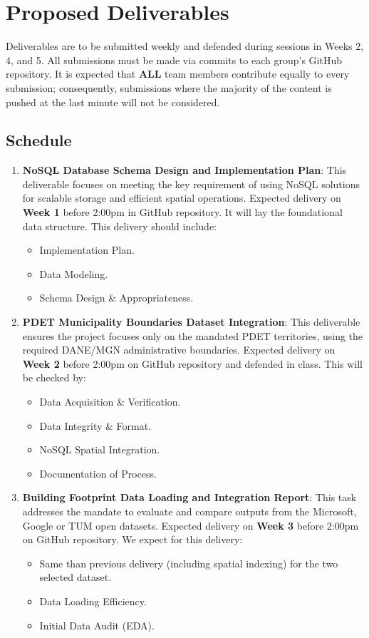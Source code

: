 \documentclass[12pt]{article}
\begin{document}
\section{Proposed Deliverables}
Deliverables are to be submitted weekly and defended during sessions in Weeks 2, 4, and 5. All submissions must be made via commits to each group's GitHub repository. It is expected that \textbf{ALL} team members contribute equally to every submission; consequently, submissions where the majority of the content is pushed at the last minute will not be considered.

\subsection{Schedule}
\begin{enumerate}
  \item \textbf{NoSQL Database Schema Design and Implementation Plan}:  This deliverable focuses on meeting the key requirement of using NoSQL solutions for scalable storage and efficient spatial operations.  Expected delivery on \textbf{Week 1} before 2:00pm in GitHub repository. It will lay the foundational data structure.  This delivery should include:
    \begin{itemize}
      \item Implementation Plan.
      \item Data Modeling.
      \item Schema Design \& Appropriateness.
    \end{itemize}

  \item \textbf{PDET Municipality Boundaries Dataset Integration}: This deliverable ensures the project focuses only on the mandated PDET territories, using the required DANE/MGN administrative boundaries. Expected delivery on \textbf{Week 2} before 2:00pm on GitHub repository and defended in class. This will be checked by:
    \begin{itemize}
      \item Data Acquisition \& Verification.
      \item Data Integrity \& Format.
      \item NoSQL Spatial Integration.
      \item Documentation of Process.
    \end{itemize}

  \item \textbf{Building Footprint Data Loading and Integration Report}:  This task addresses the mandate to evaluate and compare outputs from the Microsoft, Google or TUM open datasets. Expected delivery on \textbf{Week 3} before 2:00pm on GitHub repository. We expect for this delivery:
    \begin{itemize}
      \item Same than previous delivery (including spatial indexing) for the two selected dataset.
      \item Data Loading Efficiency.
      \item Initial Data Audit (EDA).
    \end{itemize}


\end{enumerate}
\end{document}

